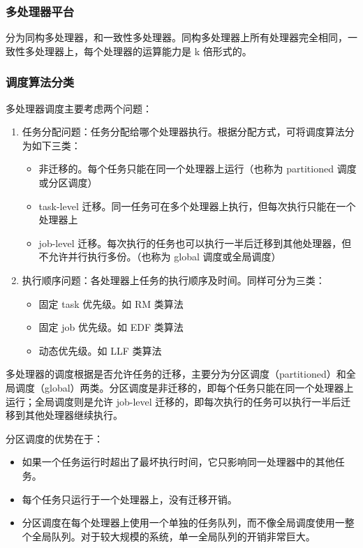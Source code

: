 \subsubsection{多处理器平台}

分为同构多处理器，和一致性多处理器。同构多处理器上所有处理器完全相同，一致性多处理器上，每个处理器的运算能力是 k 倍形式的。

\subsubsection{调度算法分类}

多处理器调度主要考虑两个问题：
\begin{enumerate}
  \item 任务分配问题：任务分配给哪个处理器执行。根据分配方式，可将调度算法分为如下三类：
      \begin{itemize}
        \item 非迁移的。每个任务只能在同一个处理器上运行（也称为 partitioned 调度或分区调度）
        \item task-level 迁移。同一任务可在多个处理器上执行，但每次执行只能在一个处理器上
        \item job-level 迁移。每次执行的任务也可以执行一半后迁移到其他处理器，但不允许并行执行多份。（也称为 global 调度或全局调度）
      \end{itemize}
  \item 执行顺序问题：各处理器上任务的执行顺序及时间。同样可分为三类：
      \begin{itemize}
        \item 固定 task 优先级。如 RM 类算法
        \item 固定 job 优先级。如 EDF 类算法
        \item 动态优先级。如 LLF 类算法
      \end{itemize}
\end{enumerate}

多处理器的调度根据是否允许任务的迁移，主要分为分区调度（partitioned）和全局调度（global）两类。分区调度是非迁移的，即每个任务只能在同一个处理器上运行；全局调度则是允许 job-level 迁移的，即每次执行的任务可以执行一半后迁移到其他处理器继续执行。

分区调度的优势在于：
\begin{itemize}
  \item 如果一个任务运行时超出了最坏执行时间，它只影响同一处理器中的其他任务。
  \item 每个任务只运行于一个处理器上，没有迁移开销。
  \item 分区调度在每个处理器上使用一个单独的任务队列，而不像全局调度使用一整个全局队列。对于较大规模的系统，单一全局队列的开销非常巨大。
\end{itemize}

